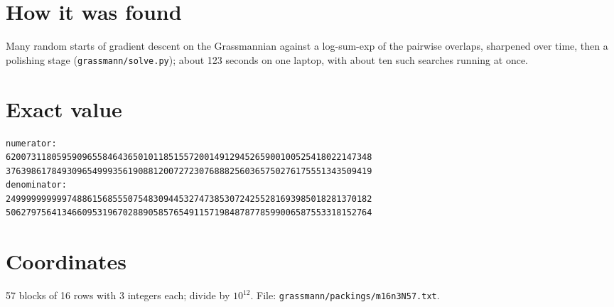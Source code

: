 \documentclass[11pt,a4paper]{article}
\begin{document}
\section{How it was found}
Many random starts of gradient descent on the Grassmannian against a log-sum-exp of the pairwise overlaps, sharpened over time, then a polishing stage (\texttt{grassmann/solve.py}); about 123 seconds on one laptop, with about ten such searches running at once.


\appendix
\section{Exact value}
{\small
\begin{verbatim}
numerator:
620073118059590965584643650101185155720014912945265900100525418022147348
376398617849309654999356190881200727230768882560365750276175551343509419
denominator:
249999999999748861568555075483094453274738530724255281693985018281370182
506279756413466095319670288905857654911571984878778599006587553318152764
\end{verbatim}}

\section{Coordinates}
57 blocks of 16 rows with 3 integers each; divide by $10^{12}$. File: \texttt{grassmann/packings/m16n3N57.txt}.
{\tiny
\begin{multicols}{3}
\end{multicols}}
\end{document}
